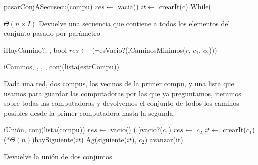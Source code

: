 \begin{Algoritmos}
	\begin{algoritmo}{pasarConjASecu}{}{secu(compu)}{}
		$res \gets$ vacia()
		 $it \gets$ crearIt(c)
		While(
	\end{algoritmo}    
  \datosAlgoritmo{} %
  {} %
  {} %
  {$\Theta(n \times I)$} %
  {Devuelve una secuencia que contiene a todos los elementos del conjunto pasado por par\'{a}metro} %
     
  \begin{algoritmo}{iHayCamino?}{, , }{bool}{}
    $res \gets$ ($\neg$esVacio?(iCaminosMinimos($r$, $c_{1}$, $c_{2}$)))
  \end{algoritmo}
  \datosAlgoritmo{} %
  {} %
  {} %
  {} %
  {} %

  \begin{algoritmo}{iCaminos}{, , , , }{conj(lista(estrCompu))}{}
  \end{algoritmo}
  \datosAlgoritmo{} %
  {} %
  {} %
  {} %
  {Dada una red, dos compus, los vecinos de la primer compu, y una lista que usamos para guardar las computadoras por las que ya preguntamos, iteramos sobre todas las computadoras y devolvemos el conjunto de todos los caminos posibles desde la primer computadora hasta la segunda. } %

  \begin{algoritmo}{iUni\'{o}n}{, }{conj(lista(compu))}
    $res \gets$ vacio()     
    \eIf(     ){vacio?($c_{1}$)}{
      $res \gets$ $c_{2}$}{
       $it \gets$ crearIt($c_{1}$)     
      \While(\com[f]*{$\Theta(n)$}){haySiguiente($it$)}{
        Ag(siguiente($it$), $c_{2}$)
        avanzar(it)
      } 
    }
  \end{algoritmo}
  \datosAlgoritmo{} %
  {} %
  {} %
  {} %
  {Devuelve la uni\'{o}n de dos conjuntos. } %


\end{Algoritmos}
